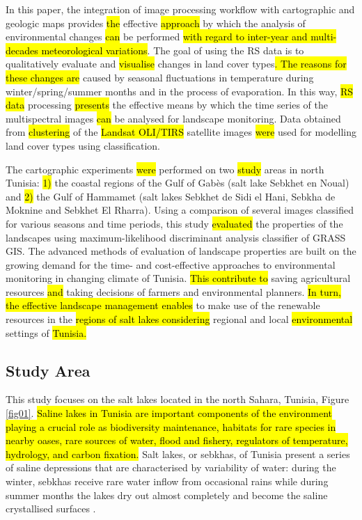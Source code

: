 \documentclass[land,article,submit,pdftex,moreauthors]{Definitions/mdpi}
\begin{document}
In this paper, the integration of image processing workflow with cartographic and geologic maps provides \hl{the} effective \hl{approach} by which the analysis of environmental changes \hl{can} be performed \hl{with regard to inter-year and multi-decades meteorological variations}. The goal of using the RS data is to qualitatively evaluate and \hl{visualise} changes in land cover types\hl{. The reasons for these changes are }caused by seasonal fluctuations in temperature during winter/spring/summer months and in the process of evaporation. In this way, \hl{RS data} processing \hl{presents} the effective means by which the time series of the multispectral images \hl{can} be analysed for landscape monitoring. Data obtained from \hl{clustering} of the \hl{Landsat OLI/TIRS }satellite images \hl{were} used for modelling land cover types using classification. 

The cartographic experiments \hl{were} performed on two \hl{study} areas in north Tunisia: \hl{1)} the coastal regions of the Gulf of Gabès (salt lake Sebkhet en Noual) and \hl{2) }the Gulf of Hammamet (salt lakes Sebkhet de Sidi el Hani, Sebkha de Moknine and Sebkhet El Rharra). Using a comparison of several images classified for various seasons and time periods, this study \hl{evaluated} the properties of the landscapes using maximum-likelihood discriminant analysis classifier of GRASS GIS. The advanced methods of evaluation of landscape properties are built on the growing demand for the time- and cost-effective approaches to environmental monitoring in changing climate of Tunisia. \hl{This contribute to }saving agricultural resources \hl{and} taking decisions of farmers and environmental planners. \hl{In turn, the effective landscape management enables} to make use of the renewable resources in the \hl{regions of salt lakes considering} regional and local \hl{environmental} settings of \hl{Tunisia.}

\subsection{Study Area}

This study focuses on the salt lakes located in the north Sahara, Tunisia, Figure \ref{fig01}. \hl{Saline lakes in Tunisia are important components of the environment playing a crucial role as biodiversity maintenance, habitats for rare species in nearby oases, rare sources of water, flood and fishery, regulators of temperature, hydrology, and carbon fixation. }Salt lakes, or sebkhas, of Tunisia present a series of saline depressions that are characterised by variability of water: during the winter, sebkhas receive rare water inflow from occasional rains while during summer months the lakes dry out almost completely and become the saline crystallised surfaces \cite{berthon1970saumures,m2001valorisation,Gautier}. 
\end{document}
